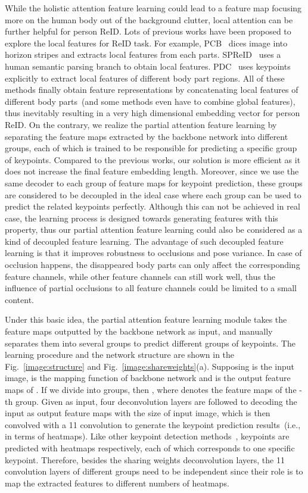 \documentclass[10pt,twocolumn,letterpaper]{article}
\begin{document}
While the holistic attention feature learning could lead to a feature map focusing more on the human body out of the background clutter, local attention can be further helpful for person ReID. Lots of previous works have been proposed to explore the local features for ReID task. For example, PCB~\cite{sun2018beyond} dices image into horizon stripes and extracts local features from each parts. SPReID~\cite{kalayeh2018human}  uses a human semantic parsing branch to obtain local features.  PDC~\cite{su2017pose} uses keypoints explicitly to extract local features of different body part regions. All of these methods finally obtain feature representations by concatenating local features of different body parts~(and some methods even have to combine global features), thus inevitably resulting in a very high dimensional embedding vector for person ReID.  
On the contrary, we realize the partial attention feature learning by separating the feature maps extracted by the backbone network into different groups, each of which is trained to be responsible for predicting a specific group of keypoints. Compared to the previous works, our solution is more efficient as it does not increase the final feature embedding length. Moreover, since we use the same decoder to each group of feature maps for keypoint prediction, these groups are considered to be decoupled in the ideal case where each group can be used to predict the related keypoints perfectly. Although this can not be achieved in real case, the learning process is designed towards generating features with this property, thus our partial attention feature learning could also be considered as a kind of decoupled feature learning. The advantage of such decoupled feature learning is that it improves robustness to occlusions and pose variance. In case of occlusion happens, the disappeared body parts can only affect the corresponding feature channels, while other feature channels can still work well, thus the influence of partial occlusions to all feature channels could be limited to a small content.

Under this basic idea, the partial attention feature learning module takes the feature maps outputted by the backbone network as input, and manually separates them into several groups to predict different groups of keypoints. The learning procedure and the network structure are shown in the Fig.~\ref{image:structure} and Fig.~\ref{image:shareweights}(a). Supposing  is the input image,  is the mapping function of backbone network and  is the output feature maps of . If we divide  into  groups, then , where  denotes the feature maps of the -th group. Given  as input, four deconvolution layers are followed to decoding the input as output feature maps with the size of input image, which is then convolved with a 11 convolution to generate the keypoint prediction results~(i.e., in terms of heatmaps). Like other keypoint detection methods~\cite{chen2018cascaded},  keypoints are predicted with  heatmaps respectively, each of which corresponds to one specific keypoint. Therefore, besides the sharing weights deconvolution layers, the 11 convolution layers of different groups need to be independent since their role is to map the extracted features to different numbers of heatmaps.
\end{document}
